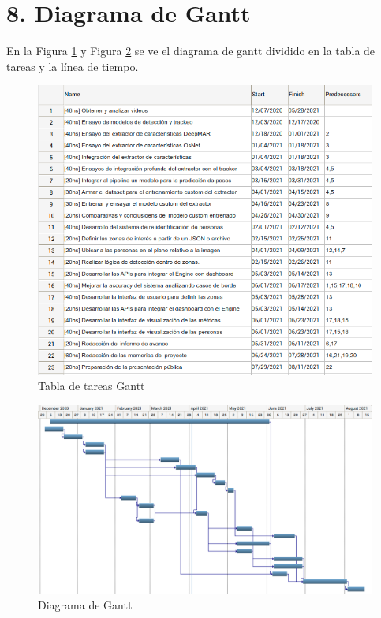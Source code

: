 \documentclass[11pt]{charter}
\begin{document}
\newpage

\section{8. Diagrama de Gantt}
\label{sec:gantt}

En la Figura \ref{fig:ganttTable} y Figura \ref{fig:ganttTimeline} se ve el diagrama de gantt dividido en la tabla de tareas y la línea de tiempo.

\begin{figure}[htpb]
\centering 
\includegraphics[width=1.\textwidth]{./Figuras/ganttTable.png}
\caption{Tabla de tareas Gantt}
\label{fig:ganttTable}
\end{figure}

\begin{figure}[htpb]
\centering 
\includegraphics[width=1.\textwidth]{./Figuras/ganttTimeline.png}
\caption{Diagrama de Gantt}
\label{fig:ganttTimeline}
\end{figure}
\end{document}
